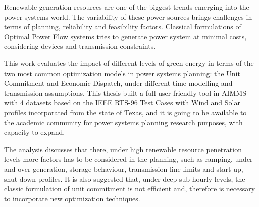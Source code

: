 Renewable generation resources are one of the biggest trends emerging into the power systems world. The variability of these power sources brings challenges in terms of planning, reliability and feasibility factors. Classical formulations of Optimal Power Flow systems tries to generate power system at minimal costs, considering devices and transmission constraints.

This work evaluates the impact of different levels of green energy in terms of the two most common optimization models in power systems planning: the Unit Commitment and Economic Dispatch, under different time modelling and transmission assumptions. This thesis built a full user-friendly tool in AIMMS with 4 datasets based on the IEEE RTS-96 Test Cases with Wind and Solar profiles incorporated from the state of Texas, and it is going to be available to the academic community for power systems planning research purposes, with capacity to expand.

The analysis discusses that there, under high renewable resource penetration levels more factors has to be considered in the planning, such as ramping, under and over generation, storage behaviour, transmission line limits and start-up, shut-down profiles. It is also suggested that, under deep sub-hourly levels, the classic formulation of unit commitment is not efficient and, therefore is necessary to incorporate new optimization techniques.